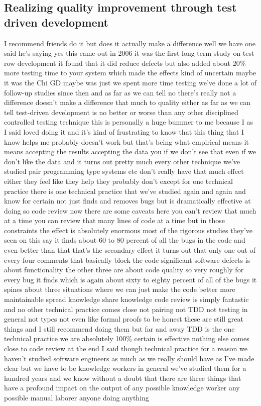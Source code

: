 \documentclass[conference, compsoc, twoside]{IEEEtran}
\begin{document}
\subsection{Realizing quality improvement through test driven development}
I recommend friends do it but does it
actually make a difference well we have
one said he's saying yes this came out
in 2006 it was the first long-term study
on test row development it found that it
did reduce defects but also added about
20\% more testing time to your system
which made the effects kind of uncertain
maybe it was the Chi GD maybe was just
we spent more time testing we've done a
lot of follow-up studies since then and
as far as we can tell no there's really
not a difference doesn't make a
difference that much to quality either
as far as we can tell test-driven
development is no better or worse than
any other disciplined controlled testing
technique this is personally a huge
bummer to me because I as I said loved
doing it and it's kind of frustrating to
know that this thing that I know helps
me probably doesn't work but that's
being what empirical means it means
accepting the results accepting the data
you
if we don't see that even if we don't
like the data and it turns out pretty
much every other technique we've studied
pair programming type systems etc don't
really have that much effect either they
feel like they help they probably don't
except for one technical practice there
is one technical practice that we've
studied again and again and know for
certain not just finds and removes bugs
but is dramatically effective at doing
so code review now there are some caveats
here you can't review that much at a
time you can review that many lines of
code at a time but in those constraints
the effect is absolutely enormous most
of the rigorous studies they've seen on
this say it finds about 60 to 80 percent
of all the bugs in the code and even
better than that that's the secondary
effect it turns out that only one out of
every four comments that basically block
the code significant software defects is
about functionality the other three are
about code quality so very roughly for
every bug it finds which is again about
sixty to eighty percent of all of the
bugs it spines about three situations
where we can just make the code better
more maintainable spread knowledge share
knowledge code review is simply
fantastic and no other technical
practice comes close not pairing not TDD
not testing in general not types not
even like formal proofs to be honest
these are still great things and I still
recommend doing them but far and away
TDD is the one technical practice we are
absolutely 100\% certain is effective
nothing else comes close to code review
at the end I said though technical
practice for a reason we haven't studied
software engineers as much as we really
should have as I've made clear but we
have to be knowledge workers in general
we've studied them for a hundred years
and we know without a doubt that there
are three things that have a profound
impact on the output of any possible knowledge worker any possible manual
laborer anyone doing anything 
\end{document}
